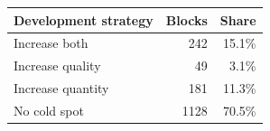 \begin{tabular}{lrr}
\hline
Development strategy & Blocks & Share \\
\hline
Increase both & 242 & 15.1\% \\
Increase quality & 49 & 3.1\% \\
Increase quantity & 181 & 11.3\% \\
No cold spot & 1128 & 70.5\% \\
\hline
\end{tabular}
